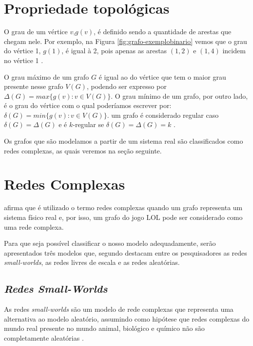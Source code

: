 \section{Propriedade topológicas}

O grau de um vértice \(v\),\(g(v)\), é definido sendo a quantidade de arestas que chegam nele. Por exemplo, na Figura \ref{fig:grafo-exemplobinario} vemos que o grau do vértice 1, \(g(1)\), é igual à 2, pois apenas as arestas \((1,2)\) e \((1,4)\) incidem no vértice 1 \cite{grafosucinto}.

O grau máximo de um grafo \(G\) é igual ao do vértice que tem o maior grau presente nesse grafo \(V(G)\), podendo ser expresso por \(\Delta(G) = max\{g(v) : v \in V(G)\}\). O grau mínimo de um grafo, por outro lado, é o grau do vértice com o qual poderíamos escrever por: \(\delta(G) = min\{g(v) : v \in V(G)\}\). um grafo é considerado regular caso \(\delta(G) = \Delta(G)\) e é \(k\)-regular se \(\delta(G) = \Delta(G) = k\) \cite{grafosucinto}.


Os grafos que são modelamos a partir de um sistema real são classificados como redes complexas, as quais veremos na seção seguinte.

\section{Redes Complexas}
\label{chap:redecomplexa}
\citet{Viana2007} afirma que é utilizado o termo redes complexas quando um grafo representa um sistema físico real e, por isso, um grafo do jogo LOL pode ser considerado como uma rede complexa.

Para que seja possível classificar o nosso modelo adequadamente, serão apresentados três modelos que, segundo \citet{albert2002statistical} destacam entre os pesquisadores as redes \textit{small-worlds}, as redes livres de escala e as redes aleatórias.

\subsection{\textit{Redes Small-Worlds}}
 As redes \textit{small-worlds} são um modelo de rede complexas que representa uma alternativa ao modelo aleatório, assumindo como hipótese que redes complexas do mundo real presente no mundo animal, biológico e químico não são completamente aleatórias \cite{watts1998collective, lopes2011redes}. 
 

